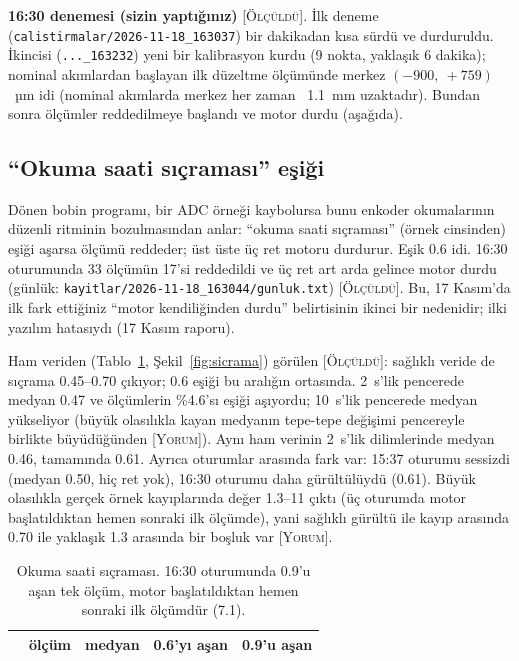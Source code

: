 \documentclass[11pt,a4paper]{article}
\newcommand{\kod}[1]{\texttt{#1}}
\newcommand{\olc}{\textsc{[Ölçüldü]}}
\newcommand{\yor}{\textsc{[Yorum]}}
\begin{document}
\textbf{16:30 denemesi (sizin yaptığınız)} \olc. İlk deneme (\kod{calistirmalar/2026-11-18\_163037}) bir dakikadan
kısa sürdü ve durduruldu. İkincisi (\kod{...\_163232}) yeni bir kalibrasyon kurdu (9 nokta, yaklaşık 6 dakika);
nominal akımlardan başlayan ilk düzeltme ölçümünde merkez $(-900,\ +759)$~µm idi (nominal akımlarda merkez her
zaman ~1.1~mm uzaktadır). Bundan sonra ölçümler reddedilmeye başlandı ve motor durdu (aşağıda).

\subsection{``Okuma saati sıçraması'' eşiği}
\label{sec:sicrama}

Dönen bobin programı, bir ADC örneği kaybolursa bunu enkoder okumalarının düzenli ritminin bozulmasından
anlar: ``okuma saati sıçraması'' (örnek cinsinden) eşiği aşarsa ölçümü reddeder; üst üste üç ret motoru durdurur.
Eşik 0.6 idi. 16:30 oturumunda 33 ölçümün 17'si reddedildi ve üç ret art arda gelince motor durdu
(günlük: \kod{kayitlar/2026-11-18\_163044/gunluk.txt}) \olc. Bu, 17 Kasım'da ilk fark ettiğiniz ``motor
kendiliğinden durdu'' belirtisinin ikinci bir nedenidir; ilki yazılım hatasıydı (17 Kasım raporu).

Ham veriden (Tablo~\ref{tab:sicrama}, Şekil~\ref{fig:sicrama}) görülen \olc: sağlıklı veride de sıçrama
0.45--0.70 çıkıyor; 0.6 eşiği bu aralığın ortasında. 2~s'lik pencerede medyan 0.47 ve ölçümlerin \%4.6'sı eşiği
aşıyordu; 10~s'lik pencerede medyan yükseliyor (büyük olasılıkla kayan medyanın tepe-tepe değişimi pencereyle
birlikte büyüdüğünden \yor). Aynı ham verinin
2~s'lik dilimlerinde medyan 0.46, tamamında 0.61. Ayrıca oturumlar arasında fark var: 15:37 oturumu sessizdi
(medyan 0.50, hiç ret yok), 16:30 oturumu daha gürültülüydü (0.61). Büyük olasılıkla gerçek örnek kayıplarında değer 1.3--11
çıktı (üç oturumda motor başlatıldıktan hemen sonraki ilk ölçümde), yani sağlıklı gürültü ile kayıp arasında
0.70 ile yaklaşık 1.3 arasında bir boşluk var \yor.

\begin{table}[h]
\centering\small
\begin{tabular}{lrrrr}
\toprule
 & ölçüm & medyan & 0.6'yı aşan & 0.9'u aşan \\
\midrule

\bottomrule
\end{tabular}
\caption{Okuma saati sıçraması. 16:30 oturumunda 0.9'u aşan tek ölçüm, motor başlatıldıktan hemen sonraki ilk
ölçümdür (7.1).}
\label{tab:sicrama}
\end{table}
\end{document}
